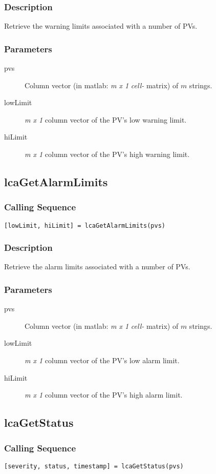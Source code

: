 \documentclass{article}
\newcommand{\pbrk}{\pagebreak[3]}
\newcommand{\ita}[1]{\emph{#1}}
\newcommand{\m}{$m$}
\newcommand{\mhack}{$m$} %
\newcommand{\mxl}{$m\times 1$}
\renewcommand{\m}{\ita{m}}
\newcommand{\mhack}{\ita{m}} %
\renewcommand{\mxl}{\ita{m x 1}}
\renewcommand{\pbrk}{}
\newcommand{\PVITEM}{
\item[pvs] Column vector (in matlab: \mxl{} \ita{cell-} matrix)
of \mhack{} strings.
}
\begin{document}
\subsubsection{Description}
Retrieve the warning limits associated with a number of PVs.
\subsubsection{Parameters}
\begin{description}
\PVITEM
\item[lowLimit] \mxl{} column vector of the PV's low warning limit.
\item[hiLimit]  \mxl{} column vector of the PV's high warning limit.
\end{description}

\vspace*{\fill}
\pbrk
\subsection{lcaGetAlarmLimits}
\subsubsection{Calling Sequence}
\begin{verbatim}
[lowLimit, hiLimit] = lcaGetAlarmLimits(pvs)
\end{verbatim}
\subsubsection{Description}
Retrieve the alarm limits associated with a number of PVs.
\subsubsection{Parameters}
\begin{description}
\PVITEM
\item[lowLimit] \mxl{} column vector of the PV's low alarm limit.
\item[hiLimit]  \mxl{} column vector of the PV's high alarm limit.
\end{description}

\vspace*{\fill}
\pbrk
\subsection{lcaGetStatus}
\subsubsection{Calling Sequence}
\begin{verbatim}
[severity, status, timestamp] = lcaGetStatus(pvs)
\end{verbatim}
\end{document}
